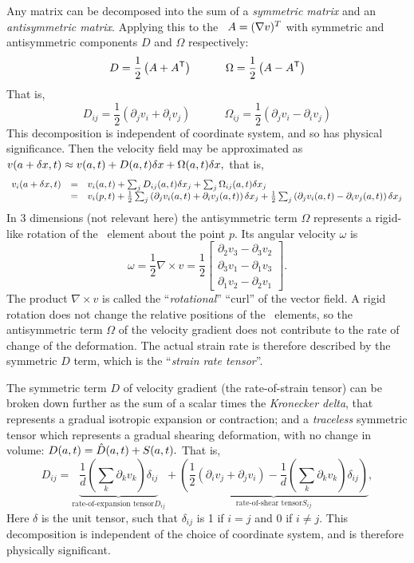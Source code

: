 \begin{description}
Any matrix can be decomposed into the sum of a {\em symmetric matrix} and
an {\em antisymmetric matrix}.
Applying this to the \stabmat\
\(A = (\nabla v)^T\) with symmetric and antisymmetric components
\(D\) and
\(\Omega\) respectively:
\[
  D = \frac{1}{2}\left( A + A^\mathsf{T}\right)\quad\quad\quad
  \Omega = \frac{1}{2}\left( A - A^\mathsf{T}\right)
\]
That is,
\[
  D_{i j} = \frac{1}{2}( \partial_j v_i + \partial_i v_j ) \quad\quad\quad
  \Omega_{i j} = \frac{1}{2}( \partial_j v_i - \partial_i v_j)
\]
This decomposition is independent of coordinate system, and so has
physical significance. Then the velocity field may be approximated as
\(v(a + {\delta x},t)
\approx v(a,t) + D(a,t){\delta x} + \Omega(a,t){\delta x},\) that is,
\[
  \begin{array}{lcl}
    v_i(a + {\delta x},t) &=&
      v_i(a,t) + \sum_j D_{i j}(a,t) {\delta x}_j + \sum_j \Omega_{i j}(a,t) {\delta x}_j\\
    ~ &=&
      v_i(p,t)
      + \frac{1}{2}\sum_j \left(\partial_j v_i(a,t)+\partial_i v_j(a,t)\right){\delta x}_j
      + \frac{1}{2}\sum_j \left(\partial_j v_i(a,t)-\partial_i v_j(a,t)\right){\delta x}_j
  \end{array}
\]
In 3 dimensions (not relevant here) the antisymmetric term
\(\Omega\) represents a rigid-like rotation of the \statesp\ element about the point
\(p\).  Its angular velocity
\(\omega\) is
\[\omega=\frac12 \nabla\times v=
\frac{1}{2}
\begin{bmatrix}
\partial_2 v_3-\partial_3 v_2\\
\partial_3 v_1-\partial_1 v_3\\
\partial_1 v_2-\partial_2 v_1
\end{bmatrix}.
\]
The product \(\nabla\times v\) is called the ``{\em rotational}''
``curl'' of the vector field.   A rigid rotation does not change the
relative positions of the \statesp\ elements, so the antisymmetric term \(\Omega\)
of the velocity gradient does not contribute to the rate of change of the
deformation.  The actual strain rate is therefore described by the
symmetric \(D\) term, which is the ``{\em strain rate tensor}''.

The symmetric term \(D\) of velocity gradient (the rate-of-strain tensor)
can be broken down further as the sum of a scalar times the {\em
Kronecker delta}, that represents a gradual isotropic expansion or
contraction; and a {\em traceless} symmetric tensor which represents a
gradual shearing deformation, with no change in volume\rf{Landau59a}:
\(D(a,t) = \hat{D}(a,t) + S(a,t).\) That is,
\[
D_{ij} =
\underbrace{\frac{1}{d}(\sum_k\partial_k v_k)
\delta_{ij}}_{\text{rate-of-expansion tensor} D_{ij}}
+
\underbrace{\left(\frac{1}{2}\left(\partial_i v_j+\partial_j v_i\right)
-\frac{1}{d}(\sum_k\partial_k v_k) \delta_{ij}\right)}_{\text{rate-of-shear tensor} S_{ij}},
\]
Here
\(\delta\) is the unit tensor, such that
\(\delta_{ij}\) is 1 if \(i = j\) and 0 if \(i \neq j\).
This decomposition is independent of the choice of coordinate system, and
is therefore physically significant.


\end{description}
